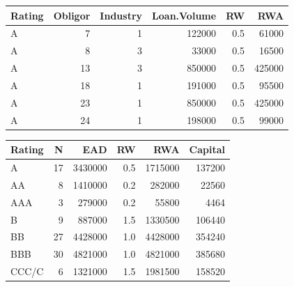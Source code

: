 \documentclass[
  11pt,
]{article}
\newenvironment{Shaded}{\begin{snugshade}}{\end{snugshade}}
\newcommand{\AttributeTok}[1]{\textcolor[rgb]{0.13,0.29,0.53}{#1}}
\newcommand{\FloatTok}[1]{\textcolor[rgb]{0.00,0.00,0.81}{#1}}
\newcommand{\FunctionTok}[1]{\textcolor[rgb]{0.13,0.29,0.53}{\textbf{#1}}}
\newcommand{\NormalTok}[1]{#1}
\newcommand{\OtherTok}[1]{\textcolor[rgb]{0.56,0.35,0.01}{#1}}
\newcommand{\SpecialCharTok}[1]{\textcolor[rgb]{0.81,0.36,0.00}{\textbf{#1}}}
\newcounter{none} %
\begin{document}
{\def\LTcaptype{none} %
\begin{longtable}[]{@{}lrrrrr@{}}
\toprule\noalign{}
Rating & Obligor & Industry & Loan.Volume & RW & RWA \\
\midrule\noalign{}
\endhead
\bottomrule\noalign{}
\endlastfoot
A & 7 & 1 & 122000 & 0.5 & 61000 \\
A & 8 & 3 & 33000 & 0.5 & 16500 \\
A & 13 & 3 & 850000 & 0.5 & 425000 \\
A & 18 & 1 & 191000 & 0.5 & 95500 \\
A & 23 & 1 & 850000 & 0.5 & 425000 \\
A & 24 & 1 & 198000 & 0.5 & 99000 \\
\end{longtable}
}

\begin{Shaded}
\end{Shaded}

{\def\LTcaptype{none} %
\begin{longtable}[]{@{}lrrrrr@{}}
\toprule\noalign{}
Rating & N & EAD & RW & RWA & Capital \\
\midrule\noalign{}
\endhead
\bottomrule\noalign{}
\endlastfoot
A & 17 & 3430000 & 0.5 & 1715000 & 137200 \\
AA & 8 & 1410000 & 0.2 & 282000 & 22560 \\
AAA & 3 & 279000 & 0.2 & 55800 & 4464 \\
B & 9 & 887000 & 1.5 & 1330500 & 106440 \\
BB & 27 & 4428000 & 1.0 & 4428000 & 354240 \\
BBB & 30 & 4821000 & 1.0 & 4821000 & 385680 \\
CCC/C & 6 & 1321000 & 1.5 & 1981500 & 158520 \\
\end{longtable}
}
\end{document}
